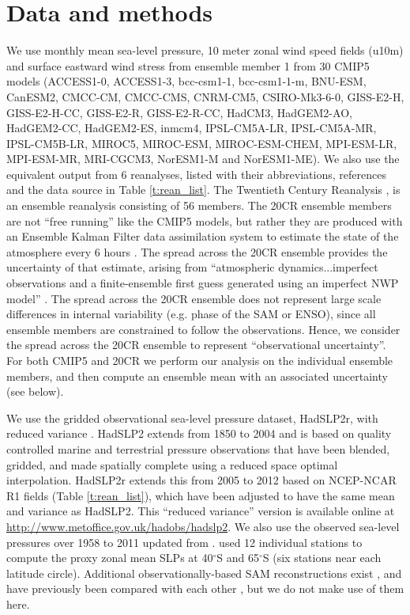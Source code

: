 \documentclass{ametsoc}
\begin{document}
\section{Data and methods} \label{sec:data_and_methods}
We use monthly mean sea-level pressure, 10 meter zonal wind speed fields (u10m) and surface eastward wind stress
from ensemble member 1 from 30 CMIP5 models 
(ACCESS1-0, ACCESS1-3, bcc-csm1-1, bcc-csm1-1-m, BNU-ESM,
CanESM2, CMCC-CM, CMCC-CMS, CNRM-CM5, CSIRO-Mk3-6-0, GISS-E2-H, GISS-E2-H-CC, GISS-E2-R, 
GISS-E2-R-CC, HadCM3, HadGEM2-AO, HadGEM2-CC, HadGEM2-ES, inmcm4, IPSL-CM5A-LR, IPSL-CM5A-MR,
IPSL-CM5B-LR, MIROC5, MIROC-ESM, MIROC-ESM-CHEM, MPI-ESM-LR, MPI-ESM-MR, MRI-CGCM3, 
NorESM1-M and NorESM1-ME). We also use the equivalent output from 6 reanalyses, listed with 
their abbreviations, references and the data source in Table \ref{t:rean_list}. The 
Twentieth Century Reanalysis \citep[20CR;][]{Compo_et_al_2011}, is an ensemble reanalysis
consisting of 56 members. The 20CR ensemble members are not ``free running'' like the CMIP5 models, 
but rather they are produced with an Ensemble Kalman Filter data assimilation system to estimate the 
state of the atmosphere every 6 hours \citep{Compo_et_al_2011}. The spread across the 20CR ensemble 
provides the uncertainty of that estimate, arising from ``atmospheric dynamics...imperfect observations
and a finite-ensemble first guess generated using an imperfect NWP model'' \citep[][p. 4]{Compo_et_al_2011}. 
The spread across the 20CR ensemble does not represent large scale differences in internal variability
(e.g. phase of the SAM or ENSO), since all ensemble members are constrained to follow the observations. 
Hence, we consider the spread across the 20CR ensemble to represent ``observational uncertainty''.
For both CMIP5 and 20CR we perform our analysis on the 
individual ensemble members, and then compute an ensemble mean with an associated uncertainty
(see below).

We use the gridded observational sea-level pressure dataset, HadSLP2r, 
with reduced variance \citep{Allan_and_Ansell_2006}. HadSLP2 extends from 1850 to 2004 
and is based on quality controlled marine and terrestrial pressure observations that
have been blended, gridded, and made spatially complete using a reduced space optimal
interpolation. HadSLP2r extends this from 2005 to 2012 based 
on NCEP-NCAR R1 fields (Table \ref{t:rean_list}), which have been adjusted 
to have the same mean and variance as HadSLP2. This ``reduced variance''
version is available online at \url{http://www.metoffice.gov.uk/hadobs/hadslp2}. We also 
use the observed sea-level pressures over 1958 to 2011 
updated from \cite{Marshall_2003}. \cite{Marshall_2003} used 12 individual stations 
to compute the proxy zonal mean SLPs at 40$^{\circ}$S and 65$^{\circ}$S (six stations
near each latitude circle). Additional observationally-based SAM reconstructions exist
\citep[e.g.][]{Jones_et_al_2009, Visbeck_2009}, and have previously been compared with each other
\citep{Ho_et_al_2012}, but we do not make use of them here.
\end{document}
